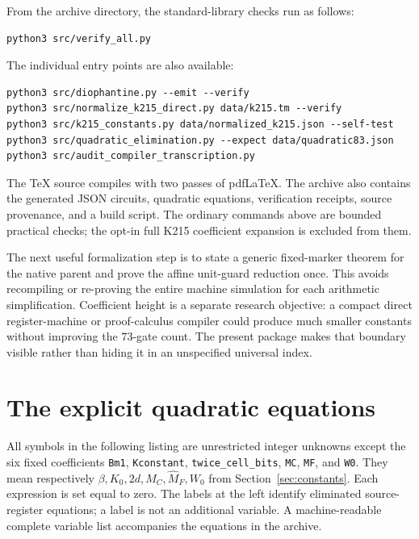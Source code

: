\documentclass[11pt]{article}
\theoremstyle{remark}\newtheorem{remark}[theorem]{Remark}
\begin{document}
From the archive directory, the standard-library checks run as follows:
\begin{lstlisting}
python3 src/verify_all.py
\end{lstlisting}
The individual entry points are also available:
\begin{lstlisting}
python3 src/diophantine.py --emit --verify
python3 src/normalize_k215_direct.py data/k215.tm --verify
python3 src/k215_constants.py data/normalized_k215.json --self-test
python3 src/quadratic_elimination.py --expect data/quadratic83.json
python3 src/audit_compiler_transcription.py
\end{lstlisting}
The TeX source compiles with two passes of pdfLaTeX. The archive
also contains the generated JSON circuits, quadratic equations,
verification receipts, source provenance, and a build script.
The ordinary commands above are bounded practical checks; the
opt-in full K215 coefficient expansion is excluded from them.

The next useful formalization step is to state a generic
fixed-marker theorem for the native parent and prove the affine
unit-guard reduction once. This avoids recompiling or re-proving
the entire machine simulation for each arithmetic simplification.
Coefficient height is a separate research objective: a compact
direct register-machine or proof-calculus compiler could produce
much smaller constants without improving the $73$-gate count.
The present package makes that boundary visible rather than
hiding it in an unspecified universal index.

\appendix
\section{The explicit quadratic equations}\label{app:quadratic}

All symbols in the following listing are unrestricted integer
unknowns except the six fixed coefficients
\texttt{Bm1}, \texttt{Kconstant}, \texttt{twice\_cell\_bits},
\texttt{MC}, \texttt{MF}, and \texttt{W0}. They mean respectively
$\beta,K_0,2d,M_C,\widehat M_F,W_0$ from
Section~\ref{sec:constants}. Each expression is set equal to zero.
The labels at the left identify eliminated source-register
equations; a label is not an additional variable. A machine-readable
complete variable list accompanies the equations in the archive.

\end{document}
